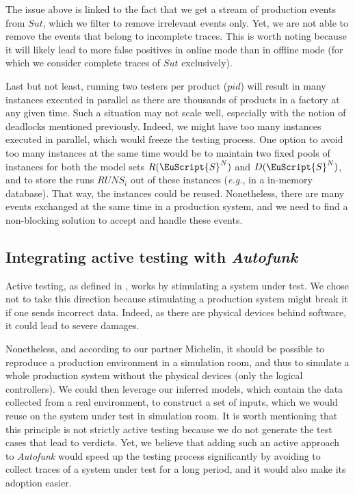 The issue above is linked to the fact that we get a stream of
production events from $\mathit{Sut}$, which we filter to remove
irrelevant events only. Yet, we are not able to remove the events
that belong to incomplete traces. This is worth noting because it
will likely lead to more false positives in online mode than in
offline mode (for which we consider complete traces of
$\mathit{Sut}$ exclusively).

Last but not least, running two testers per product ($pid$) will
result in many instances executed in parallel as there are
thousands of products in a factory at any given time. Such a
situation may not scale well, especially with the notion of
deadlocks mentioned previously. Indeed, we might have too many
instances executed in parallel, which would freeze the testing
process. One option to avoid too many instances at the same time
would be to maintain two fixed pools of instances for both the
model sets $R(\EuScript{S}^N)$ and $D(\EuScript{S}^N)$, and to
store the runs $RUNS_i$ out of these instances (\emph{e.g.}, in a
in-memory database). That way, the instances could be reused.
Nonetheless, there are many events exchanged at the same time in
a production system, and we need to find a non-blocking solution
to accept and handle these events.


\subsection{Integrating active testing with \emph{Autofunk}}
\label{sec:conclusion:testing:active}

Active testing, as defined in
,
works by stimulating a system under test. We chose not to take
this direction because stimulating a production system might
break it if one sends incorrect data. Indeed, as there are
physical devices behind software, it could lead to severe
damages.

Nonetheless, and according to our partner Michelin, it
should be possible to reproduce a production environment in a
simulation room, and thus to simulate a whole production system
without the physical devices (only the logical controllers). We
could then leverage our inferred models, which contain the data
collected from a real environment, to construct a set of inputs,
which we would reuse on the system under test in simulation room.
It is worth mentioning that this principle is not strictly active
testing because we do not generate the test cases that lead to
verdicts.  Yet, we believe that adding such an active approach to
\textit{Autofunk} would speed up the testing process
significantly by avoiding to collect traces of a system under
test for a long period, and it would also make its adoption
easier.

